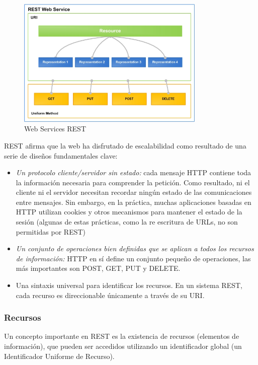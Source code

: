 \begin{figure}[htbp]
  \centering
    \includegraphics[width=0.8\textwidth]{imagenes/REST.jpg}
     \caption{Web Services REST}
    \label{fig:REST}
\end{figure}

REST afirma que la web ha disfrutado de escalabilidad como resultado de una serie de diseños fundamentales clave:

\begin{itemize}
    \item \emph{Un protocolo cliente/servidor sin estado:} cada mensaje HTTP contiene toda la información necesaria para comprender la petición. Como resultado, ni el cliente ni el servidor necesitan recordar ningún estado de las comunicaciones entre mensajes. Sin embargo, en la práctica, muchas aplicaciones basadas en HTTP utilizan cookies y otros mecanismos para mantener el estado de la sesión (algunas de estas prácticas, como la re escritura de URLs, no son permitidas por REST)
    
    \item \emph{Un conjunto de operaciones bien definidas que se aplican a todos los recursos de información:} HTTP en sí define un conjunto pequeño de operaciones, las más importantes son POST, GET, PUT y DELETE.
    
    \item Una sintaxis universal para identificar los recursos. En un sistema REST, cada recurso es direccionable únicamente a través de su \gls{URI}.
   
 \end{itemize}
 
 \subsubsection{Recursos}
 Un concepto importante en REST es la existencia de recursos (elementos de información), que pueden ser accedidos utilizando un identificador global (un Identificador Uniforme de Recurso).
 
